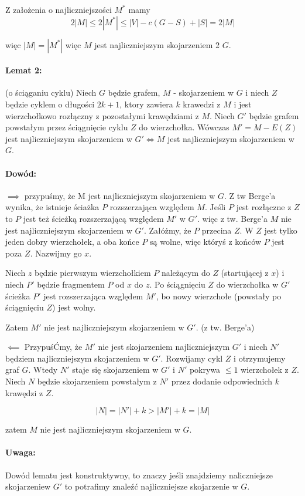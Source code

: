 Z założenia o najliczniejszości $M^*$ mamy
$$ 2|M| \leq 2|M^*| \leq |V| - c(G-S) + |S| = 2|M|$$

więc $|M| = |M^*|$ więc $M$ jest najliczniejszym skojarzeniem 2 $G$.

\paragraph{Lemat 2:}{(o ściąganiu cyklu)}
Niech $G$ będzie grafem, $M$ - skojarzeniem w $G$ i niech $Z$ będzie cyklem o długości $2k+1$, ktory zawiera $k$ krawedzi z $M$ i jest wierzchołkowo rozłączny z pozostałymi krawędziami z $M$.
Niech $G'$ będzie grafem powstałym przez ściągnięcie cyklu $Z$ do wierzchołka. Wówczas $M' = M - E(Z)$ jest najliczniejszym skojarzeniem w $G' \iff M$ jest najliczniejszym skojarzeniem w $G$.

\paragraph{Dowód:}
$\implies$ przypuśmy, że M jest najliczniejszym skojarzeniem w $G$. Z tw Berge'a wynika, że istnieje ściażka $P$ rozszerzająca względem $M$. Jeśli $P$ jest rozłączne z $Z$ to $P$ jest też ścieżką rozszerzającą względem $M'$ w $G'$.
więc z tw. Berge'a $M$ nie jest najliczniejszym skojarzeniem w $G'$. Załóżmy, że $P$ przecina $Z$. W $Z$ jest tylko jeden dobry wierzchołek, a oba końce $P$ są wolne, więc któryś z końców $P$ jest poza $Z$. Nazwijmy go $x$.

Niech $z$ będzie pierwszym wierzchołkiem $P$ należącym do $Z$ (startującej z $x$) i niech $P'$ będzie fragmentem $P$ od $x$ do $z$.
Po ściągnięciu $Z$ do wierzchołka w $G'$ ścieżka $P'$ jest rozszerzająca względem $M'$, bo nowy wierzchołe (powstały po ściągnięciu $Z$) jest wolny.

Zatem $M'$ nie jest najliczniejszym skojarzeniem w $G'$. (z tw. Berge'a)

$\impliedby$ PrzypuśĆmy, że $M'$ nie jest skojarzeniem najliczniejszym  $G'$ i niech $N'$ będziem najliczniejszym skojarzeniem w $G'$.
Rozwijamy cykl $Z$ i otrzymujemy graf $G$. Wtedy $N'$ staje się skojarzeniem w $G'$ i  $N'$ pokrywa $\leq 1$ wierzchołek z $Z$. 
Niech $N$ będzie skojarzeniem powstałym z $N'$ przez dodanie odpowiednich $k$ krawędzi z $Z$.

$$ |N| = |N'| + k > |M'| + k = |M| $$ 

zatem $M$ nie jest najliczniejszym skojarzeniem w $G$.

\paragraph{Uwaga:}
Dowód lematu jest konstruktywny, to znaczy jeśli znajdziemy naliczniejsze skojarzeniew $G'$ to potrafimy znaleźć najliczniejsze skojarzenie w $G$.

